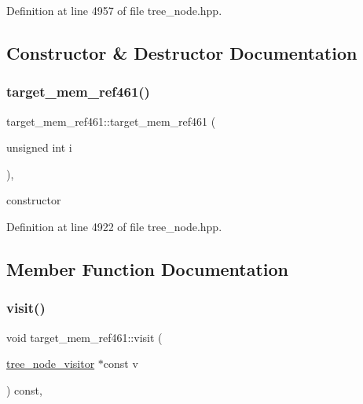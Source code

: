 Definition at line 4957 of file tree\+\_\+node.\+hpp.



\subsection{Constructor \& Destructor Documentation}
\mbox{\label{structtarget__mem__ref461_ab764a2aea5d137a6b5c61023d2378c3e}} 
\subsubsection{\texorpdfstring{target\+\_\+mem\+\_\+ref461()}{target\_mem\_ref461()}}
{\footnotesize\ttfamily target\+\_\+mem\+\_\+ref461\+::target\+\_\+mem\+\_\+ref461 (\begin{DoxyParamCaption}\item[{unsigned int}]{i }\end{DoxyParamCaption})\hspace{0.3cm}{\ttfamily [inline]}, {\ttfamily [explicit]}}



constructor 



Definition at line 4922 of file tree\+\_\+node.\+hpp.



\subsection{Member Function Documentation}
\mbox{\label{structtarget__mem__ref461_af45ee8b7f6831742eb9108a5987d871e}} 
\subsubsection{\texorpdfstring{visit()}{visit()}}
{\footnotesize\ttfamily void target\+\_\+mem\+\_\+ref461\+::visit (\begin{DoxyParamCaption}\item[{\hyperlink{classtree__node__visitor}{tree\+\_\+node\+\_\+visitor} $\ast$const}]{v }\end{DoxyParamCaption}) const\hspace{0.3cm}{\ttfamily [override]}, {\ttfamily [virtual]}}



